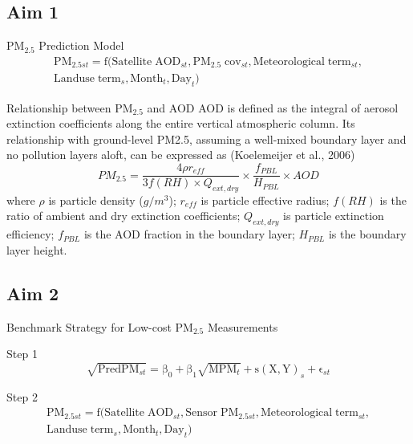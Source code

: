 \documentclass[handout]{beamer} %
\begin{document}
\subsection*{Aim 1}

\begin{frame}{PM$_{2.5}$ Prediction Model}
    \begin{align*}
        \mathrm{PM_{2.5\mathit{st}}=f(Satellite\;AOD_{\mathit{st}},PM_{2.5}\;cov_{\mathit{st}},Meteorological\;term_{\mathit{st}}, } \\
        \mathrm{Landuse\;term_\mathit{s},Month_\mathit{t}, Day_\mathit{t})}
    \end{align*}
\end{frame}

\begin{frame}{Relationship between PM$_{2.5}$ and AOD}
    AOD is defined as the integral of aerosol extinction coefficients along the entire vertical atmospheric column. Its relationship with ground-level PM2.5, assuming a well-mixed boundary layer and no pollution layers aloft, can be expressed as (Koelemeijer et al., 2006)
    \begin{equation*}
        PM_{2.5}=\frac{4\rho r_{eff}}{3f(RH)\times Q_{ext,dry}}\times\frac{f_{PBL}}{H_{PBL}}\times AOD
    \end{equation*}
    where $\rho$ is particle density ($g/m^3$); $r_{eff}$ is particle effective radius; $f(RH)$ is the ratio of ambient and dry extinction coefficients; $Q_{ext,dry}$ is particle extinction efficiency; $f_{PBL}$ is the AOD fraction in the boundary layer; $H_{PBL}$ is the boundary layer height.
\end{frame}

\subsection*{Aim 2}

\begin{frame}{Benchmark Strategy for Low-cost PM$_{2.5}$ Measurements}
    \begin{block}{Step 1}
            \begin{equation*}
        \mathrm{\sqrt{PredPM_\mathit{st}}=\beta_0+\beta_1 \sqrt{MPM_\mathit{t}}+s(X,Y)_\mathit{s}+\epsilon_\mathit{st}}
    \end{equation*}
    \end{block}
    \begin{block}{Step 2}
        \begin{align*}
        \mathrm{PM_{2.5\mathit{st}}=f(Satellite\;AOD_{\mathit{st}},Sensor\;PM_{2.5\mathit{st}},Meteorological\;term_{\mathit{st}},}\\
        \mathrm{Landuse\;term_\mathit{s},Month_\mathit{t}, Day_\mathit{t})}
        \end{align*}
    \end{block}
\end{frame}
\end{document}
